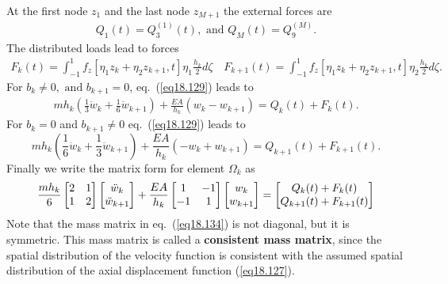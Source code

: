 \documentclass{AeroStructure-ERJohnson}
\begin{document}
At the first node ${z_1}$ and the last node ${z_{M+1}}$ the external forces are
\begin{align}\label{eq18.131}
Q_{1}(t)=Q_{3}^{(1)}(t),\text{ and }Q_{M}(t)=Q_{9}^{(M)}.
\end{align}
The distributed loads lead to forces
\begin{align}\label{eq18.132}
F_{k}(t)=\int_{-1}^{1} f_{z}\left[\eta_{1} z_{k}+\eta_{2} z_{k+1}, t\right] \eta_{1} \frac{h_{k}}{2} d \zeta \quad F_{k+1}(t)=\int_{-1}^{1} f_{z}\left[\eta_{1} z_{k}+\eta_{2} z_{k+1}, t\right] \eta_{2} \frac{h_{k}}{2} d \zeta.
\end{align}
For $b_{k} \neq 0,\text{ and }b_{k+1}=0$, eq.~(\ref{eq18.129}) leads to
\begin{align}\label{eq18.133}
m h_{k}\left(\frac{1}{3} \ddot{w}_{k}+\frac{1}{6} \ddot{w}_{k+1}\right)+\frac{E A}{h_{k}}\left(w_{k}-w_{k+1}\right)=Q_{k}(t)+F_{k}(t).
\end{align}
For $b_{k}=0$ and $b_{k+1} \neq 0$ eq.~(\ref{eq18.129}) leads to
\[
m h_{k}\left(\frac{1}{6} \ddot{w}_{k}+\frac{1}{3} \ddot{w}_{k+1}\right)+\frac{E A}{h_{k}}\left(-w_{k}+w_{k+1}\right)=Q_{k+1}(t)+F_{k+1}(t).
\]
Finally we write the matrix form for element $\Omega_k$ as
\begin{align}\label{eq18.134}
\frac{m h_{k}}{6}\left[\begin{array}{@{}ll@{}}2 & 1 \\1 & 2\end{array}\right]\left[\begin{array}{@{}c@{}}\ddot{w}_{k} \\\ddot{w}_{k+1}\end{array}\right]+\frac{E A}{h_{k}}\left[\begin{array}{@{}cc@{}}1 & -1 \\-1 & 1\end{array}\right]\left[\begin{array}{@{}c@{}}w_{k} \\w_{k+1}\end{array}\right]=\left[\begin{array}{@{}c@{}}Q_{k}(t)+F_{k}(t) \\Q_{k+1}(t)+F_{k+1}(t)\end{array}\right]
\end{align}
Note that the mass matrix in eq.~(\ref{eq18.134}) is not diagonal, but it is symmetric. This mass matrix is called a \textbf{consistent mass matrix}, since the spatial distribution of the velocity function is consistent with the assumed spatial distribution of the axial displacement function (\ref{eq18.127}).
\end{document}

